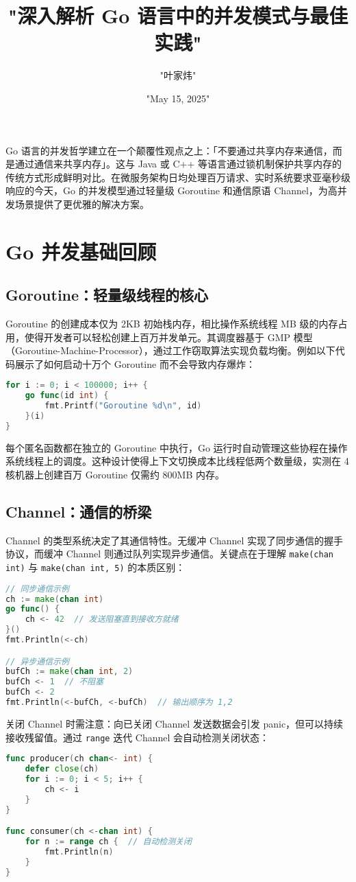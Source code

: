 \title{"深入解析 Go 语言中的并发模式与最佳实践"}
\author{"叶家炜"}
\date{"May 15, 2025"}
\maketitle
Go 语言的并发哲学建立在一个颠覆性观点之上：「不要通过共享内存来通信，而是通过通信来共享内存」。这与 Java 或 C++ 等语言通过锁机制保护共享内存的传统方式形成鲜明对比。在微服务架构日均处理百万请求、实时系统要求亚毫秒级响应的今天，Go 的并发模型通过轻量级 Goroutine 和通信原语 Channel，为高并发场景提供了更优雅的解决方案。\par
\chapter{Go 并发基础回顾}
\section{Goroutine：轻量级线程的核心}
Goroutine 的创建成本仅为 2KB 初始栈内存，相比操作系统线程 MB 级的内存占用，使得开发者可以轻松创建上百万并发单元。其调度器基于 GMP 模型（Goroutine-Machine-Processor），通过工作窃取算法实现负载均衡。例如以下代码展示了如何启动十万个 Goroutine 而不会导致内存爆炸：\par
\begin{lstlisting}[language=go]
for i := 0; i < 100000; i++ {
    go func(id int) {
        fmt.Printf("Goroutine %d\n", id)
    }(i)
}
\end{lstlisting}
每个匿名函数都在独立的 Goroutine 中执行，Go 运行时自动管理这些协程在操作系统线程上的调度。这种设计使得上下文切换成本比线程低两个数量级，实测在 4 核机器上创建百万 Goroutine 仅需约 800MB 内存。\par
\section{Channel：通信的桥梁}
Channel 的类型系统决定了其通信特性。无缓冲 Channel 实现了同步通信的握手协议，而缓冲 Channel 则通过队列实现异步通信。关键点在于理解 \verb!make(chan int)! 与 \verb!make(chan int, 5)! 的本质区别：\par
\begin{lstlisting}[language=go]
// 同步通信示例
ch := make(chan int)
go func() {
    ch <- 42  // 发送阻塞直到接收方就绪
}()
fmt.Println(<-ch)

// 异步通信示例
bufCh := make(chan int, 2)
bufCh <- 1  // 不阻塞
bufCh <- 2  
fmt.Println(<-bufCh, <-bufCh)  // 输出顺序为 1,2
\end{lstlisting}
关闭 Channel 时需注意：向已关闭 Channel 发送数据会引发 panic，但可以持续接收残留值。通过 \verb!range! 迭代 Channel 会自动检测关闭状态：\par
\begin{lstlisting}[language=go]
func producer(ch chan<- int) {
    defer close(ch)
    for i := 0; i < 5; i++ {
        ch <- i
    }
}

func consumer(ch <-chan int) {
    for n := range ch {  // 自动检测关闭
        fmt.Println(n)
    }
}
\end{lstlisting}
